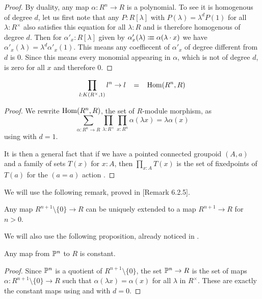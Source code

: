 \begin{proof}
  By duality, any map $\alpha:R^n\to R$ is a polynomial.
  To see it is homogenous of degree $d$, let us first note that any $P:R[\lambda]$ with $P(\lambda)=\lambda^d P(1)$
  for all $\lambda:R^\times$ also satisfies this equation for all $\lambda : R$ and is therefore homogenous of degree $d$.
  Then for $\alpha'_x:R[\lambda]$ given by $\alpha'_x(\lambda)\vcentcolon\mspace{-1.2mu}\equiv \alpha(\lambda\cdot x)$
  we have $\alpha'_x(\lambda)=\lambda^d \alpha'_x(1)$. This means any coeffiecent of $\alpha'_x$
  of degree different from $d$ is 0. Since this means every monomial appearing in $\alpha$,
  which is not of degree $d$, is zero for all $x$ and therefore 0.   
\end{proof}

\begin{proposition}\label{end}
  $$\prod_{l:K(R^{\times},1)}l^n\rightarrow l \;\;\;=\;\;\; \mathrm{Hom}(R^n,R)$$
\end{proposition}

\begin{proof}
We rewrite $\mathrm{Hom}(R^n,R)$, the set of $R$-module morphism, as
$$
\sum_{\alpha:R^n\rightarrow R}\prod_{\lambda:R^\times}\prod_{x:R^n}\alpha(\lambda x) = \lambda \alpha(x)
$$
using  with $d=1$.

\medskip

It is then a general fact that if we have a pointed connected groupoid $(A,a)$ and a family of
sets $T(x)$ for $x:A$, then $\prod_{x:A}T(x)$ is the set of fixedpoints of $T(a)$ for the $(a=a)$ action
\cite{Sym}.
\end{proof}

We will use the following remark, proved in \cite{draft}[Remark 6.2.5].

\begin{lemma}\label{ext}
  Any map $R^{n+1}\setminus\{0\}\rightarrow R$ can be uniquely extended to a map $R^{n+1}\rightarrow R$ for $n>0$.
\end{lemma}

We will also use the following proposition, already noticed in \cite{draft}.

\begin{proposition}\label{const}
  Any map from $\mathbb{P}^n$ to $R$ is constant.
\end{proposition}

\begin{proof}
  Since $\mathbb{P}^n$ is a quotient of $R^{n+1}\setminus\{0\}$, the set $\mathbb{P}^n\rightarrow R$ is
  the set of maps $\alpha:R^{n+1}\setminus\{0\}\rightarrow R$
  such that $\alpha(\lambda x) = \alpha(x)$ for all $\lambda$ in $R^\times$.
  These are exactly the constant maps
  using  and  with $d=0$.
\end{proof}

